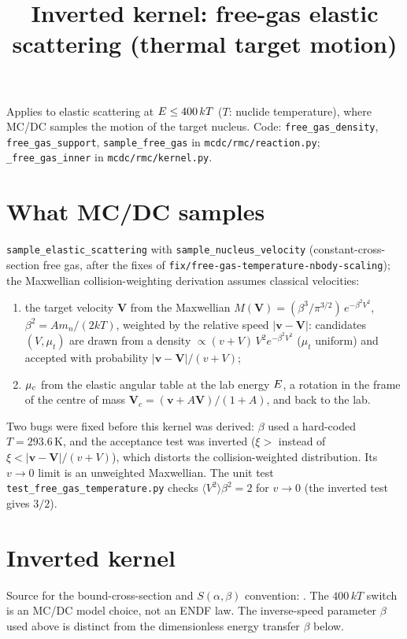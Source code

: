 \documentclass[11pt]{article}
\title{Inverted kernel: free-gas elastic scattering (thermal target motion)}
\date{}
\begin{document}
\maketitle

\noindent Applies to elastic scattering at $E \le 400\,kT$ ($T$: nuclide
temperature), where MC/DC samples the motion of the target nucleus. Code:
\texttt{free\_gas\_density}, \texttt{free\_gas\_support}, \texttt{sample\_free\_gas}
in \texttt{mcdc/rmc/reaction.py}; \texttt{\_free\_gas\_inner} in
\texttt{mcdc/rmc/kernel.py}.

\section{What MC/DC samples}

\texttt{sample\_elastic\_scattering} with \texttt{sample\_nucleus\_velocity}
(constant-cross-section free gas, after the fixes of
\texttt{fix/free-gas-temperature-nbody-scaling}); the Maxwellian collision-weighting
derivation assumes classical velocities:
\begin{enumerate}
  \item the target velocity $\bm V$ from the Maxwellian
  $M(\bm V) = (\beta^3/\pi^{3/2})\,e^{-\beta^2 V^2}$, $\beta^2 = A m_n/(2kT)$, weighted
  by the relative speed $|\bm v - \bm V|$: candidates $(V, \mu_t)$ are drawn from a
  density $\propto (v + V)\,V^2 e^{-\beta^2V^2}$ ($\mu_t$ uniform) and accepted with
  probability $|\bm v - \bm V|/(v + V)$;
  \item $\mu_{c}$ from the elastic angular table at the lab energy $E$, a rotation in
  the frame of the centre of mass $\bm V_c = (\bm v + A\bm V)/(1+A)$, and back to the
  lab.
\end{enumerate}
Two bugs were fixed before this kernel was derived: $\beta$ used a hard-coded
$T = 293.6$\,K, and the acceptance test was inverted ($\xi >$ instead of
$\xi < |\bm v - \bm V|/(v+V)$), which distorts the collision-weighted distribution.
Its $v\to0$ limit is an unweighted Maxwellian. The unit test
\texttt{test\_free\_gas\_temperature.py} checks $\langle V^2\rangle\beta^2 = 2$ for
$v \to 0$ (the inverted test gives $3/2$).

\section{Inverted kernel}

\noindent Source for the bound-cross-section and $S(\alpha,\beta)$ convention:
.
The $400\,kT$ switch is an MC/DC model choice, not an ENDF law. The inverse-speed
parameter $\beta$ used above is distinct from the dimensionless energy transfer
$\beta$ below.
\end{document}
